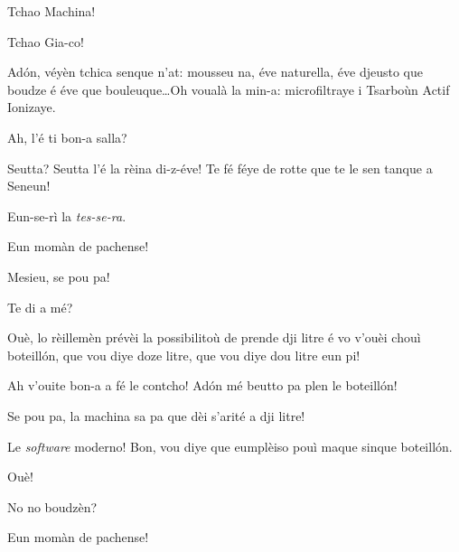\begin{drama}


\Giacospeaks{} Tchao Machina!

\Machinaspeaks {} Tchao Gia-co!

\Giacospeaks Ad\'on, véyèn tchica senque n’at: mousseu na, éve naturella, éve djeusto que boudze é éve que bouleuque\ldots Oh voualà la min-a: microfiltraye i Tsarboùn Actif Ionizaye.

\Giadaspeaks Ah, l’é ti bon-a salla?

\Giacospeaks{} Seutta? Seutta l'é la rèina di-z-éve! Te fé féye de rotte que te le sen tanque a Seneun! 

\Machinaspeaks  Eun-se-rì la \textit{tes-se-ra}.

\Giacospeaks Eun momàn de pachense!



\Valletspeaks {} Mesieu, se pou pa! 

\Giacospeaks Te di a mé?

\Valletspeaks Ouè, lo rèillemèn prévèi la possibilitoù de prende dji litre é vo v'ouèi chouì boteill\'on, que vou diye doze litre, que vou diye dou litre eun pi!

\Giacospeaks Ah v'ouite bon-a a fé le contcho! Ad\'on mé beutto pa plen le boteill\'on!

\Valletspeaks Se pou pa, la machina sa pa que dèi s'arité a dji litre!

\Giacospeaks{} Le \textit{software} moderno! Bon, vou diye que eumplèiso pouì maque sinque boteill\'on.

\Valletspeaks Ouè!


\Valletspeaks No no boudzèn?

\Giacospeaks Eun momàn de pachense!


\end{drama}
